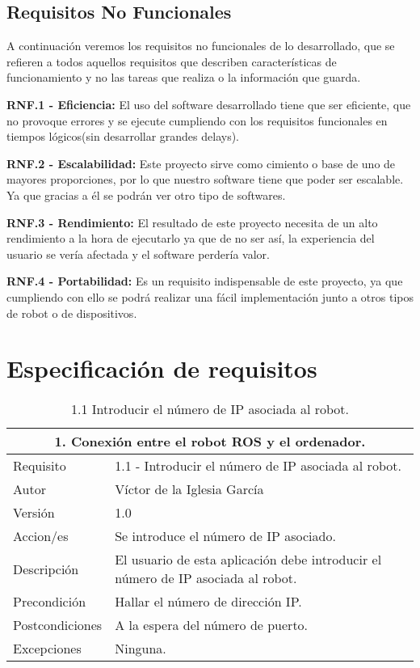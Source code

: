 \subsection{Requisitos No Funcionales}
A continuación veremos los requisitos  no funcionales de lo desarrollado, que se refieren a todos aquellos requisitos que describen características de funcionamiento y no las tareas que realiza o la información que guarda.


\textbf{RNF.1 - Eficiencia:} El uso del software desarrollado tiene que ser eficiente, que no provoque errores y se ejecute cumpliendo con los requisitos funcionales en tiempos lógicos(sin desarrollar grandes delays).

 \textbf{RNF.2 - Escalabilidad:} Este proyecto sirve como cimiento o base de uno de mayores proporciones, por lo que nuestro software tiene que poder ser escalable. Ya que gracias a él se podrán ver otro tipo de softwares.

\textbf{RNF.3 - Rendimiento:} El resultado de este proyecto necesita de un alto rendimiento a la hora de ejecutarlo ya que de no ser así, la experiencia del usuario se vería afectada y el software perdería valor.

 \textbf{RNF.4 - Portabilidad:} Es un requisito indispensable de este proyecto, ya que cumpliendo con ello se podrá realizar una fácil implementación junto a otros tipos de robot o de dispositivos.

\newpage

\section{Especificación de requisitos}
\begin{table}[h]
    \centering
    \begin{tabular}{| m{3cm} | m{8cm} |}
    \hline
         \multicolumn{2}{|c|}{\textbf{1. Conexión entre el robot ROS y el ordenador.}}                \\ \hline
        Requisito & 1.1 - Introducir el número de IP asociada al robot.  \\ \hline
       Autor  &  Víctor de la Iglesia García \\ \hline
        Versión & 1.0 \\ \hline
        Accion/es & Se introduce el número de IP asociado. \\ \hline
         Descripción & El usuario de esta aplicación debe introducir el número de IP asociada al robot. \\ \hline
        Precondición & Hallar el número de dirección IP. \\ \hline
        Postcondiciones & A la espera del número de puerto. \\ \hline
        Excepciones & Ninguna. \\ \hline
    \end{tabular}
    \caption{1.1 Introducir el número de IP asociada al robot.}
    \label{1.1 Introducir el número de IP asociada al robot.}
\end{table}


